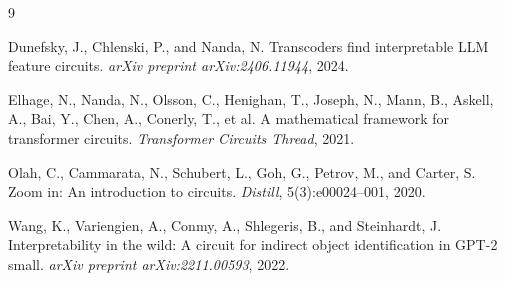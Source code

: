\documentclass{article}
\begin{document}

\begin{thebibliography}{9}

Dunefsky, J., Chlenski, P., and Nanda, N.
\newblock Transcoders find interpretable LLM feature circuits.
\newblock \emph{arXiv preprint arXiv:2406.11944}, 2024.

Elhage, N., Nanda, N., Olsson, C., Henighan, T., Joseph, N., Mann, B.,
  Askell, A., Bai, Y., Chen, A., Conerly, T., et al.
\newblock A mathematical framework for transformer circuits.
\newblock \emph{Transformer Circuits Thread}, 2021.

Olah, C., Cammarata, N., Schubert, L., Goh, G., Petrov, M., and Carter, S.
\newblock Zoom in: An introduction to circuits.
\newblock \emph{Distill}, 5(3):e00024--001, 2020.

Wang, K., Variengien, A., Conmy, A., Shlegeris, B., and Steinhardt, J.
\newblock Interpretability in the wild: A circuit for indirect object
  identification in GPT-2 small.
\newblock \emph{arXiv preprint arXiv:2211.00593}, 2022.

\end{thebibliography}
\end{document}
